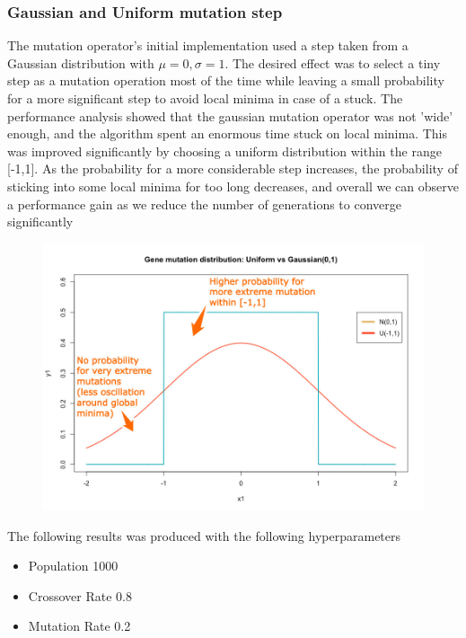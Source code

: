 \documentclass[openany]{article}
\begin{document}
				\subsubsection{Gaussian and Uniform mutation step}
				The mutation operator's initial implementation used a step taken from a Gaussian distribution with $\mu=0,\sigma=1$. 
				The desired effect was to select a tiny step as a mutation operation most of the time while leaving a small probability for a 
				more significant step to avoid local minima in case of a stuck. The performance analysis showed that the gaussian mutation operator
				was not 'wide' enough, and the algorithm spent an enormous time stuck on local minima. This was improved significantly by choosing 
				a uniform distribution within the range [-1,1]. As the probability for a more considerable step increases, the probability of 
				sticking into some local minima for too long decreases, and overall we can observe a performance gain as we reduce the number of
				generations to converge significantly
				\begin{figure}[H]
					\iftrue
					\centering
					\includegraphics[scale=0.4]{res/geneMutation.jpeg}
					\fi
				\end{figure}	
				\begin{note}
					The following results was produced with the following hyperparameters
					\begin{itemize}
						\item Population 1000
						\item Crossover Rate 0.8
						\item Mutation Rate 0.2
					\end{itemize}
				\end{note}
\end{document}
